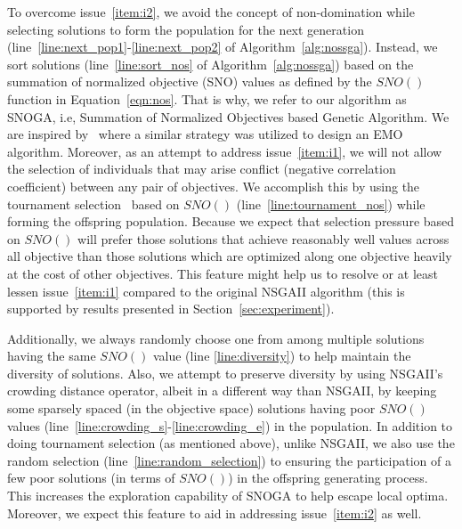 To overcome issue~\ref{item:i2}, we avoid the concept of non-domination while selecting solutions to form the population for the next generation (line~\ref{line:next_pop1}-\ref{line:next_pop2} of Algorithm~\ref{alg:nossga}). Instead, we sort solutions (line~\ref{line:sort_nos} of Algorithm~\ref{alg:nossga}) based on the summation of normalized objective (SNO) values as defined by the $SNO()$ function in Equation~\ref{eqn:nos}. That is why, we refer to our algorithm as SNOGA, i.e, Summation of Normalized Objectives based Genetic Algorithm. We are inspired by~\cite{qu2010multi} where a similar strategy was utilized to design an EMO algorithm. Moreover, as an attempt to address issue~\ref{item:i1}, we will not allow the selection of individuals that may arise conflict (negative correlation coefficient) between any pair of objectives. We accomplish this by using the tournament selection~\cite{goldberg1991comparative} based on $SNO()$ (line~\ref{line:tournament_nos}) while forming the offspring population.
Because we expect that selection pressure based on $SNO()$ will prefer those solutions that achieve reasonably well values across all objective than those solutions which are optimized along one objective heavily at the cost of other objectives. This feature might help us to resolve or at least lessen issue~\ref{item:i1} compared to the original NSGAII algorithm (this is supported by results presented in Section~\ref{sec:experiment}). 

Additionally, we always randomly choose one from among multiple solutions having the same $SNO()$ value (line \ref{line:diversity}) to help maintain the diversity of solutions. Also, we attempt to preserve diversity by using NSGAII's crowding distance operator, albeit in a different way than NSGAII, by keeping some sparsely spaced (in the objective space) solutions having poor $SNO()$ values (line~\ref{line:crowding_s}-\ref{line:crowding_e}) in the population. In addition to doing tournament selection (as mentioned above), unlike NSGAII, we also use the random selection (line~\ref{line:random_selection}) to ensuring the participation of a few poor solutions (in terms of $SNO()$) in the offspring generating process. This increases the exploration capability of SNOGA to help escape local optima. Moreover, we expect this feature to aid in addressing issue~\ref{item:i2} as well.




